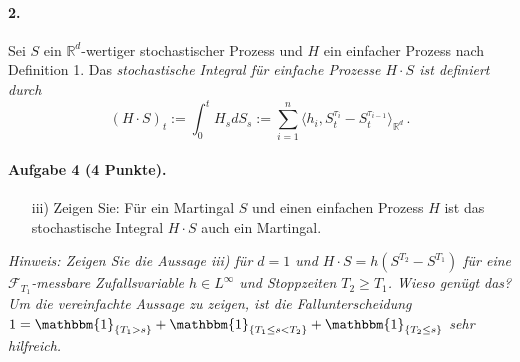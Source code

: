 \documentclass{article}
\begin{document}
\paragraph{ 2.} Sei $S$ ein $\mathbb{R}^d$-wertiger stochastischer Prozess und $H$ ein einfacher Prozess nach Definition 1.
Das \emph{stochastische Integral für einfache Prozesse $H\cdot S$ ist definiert durch}
\[
  (H\cdot S)_t:=\int_0^tH_sdS_s:=\sum_{i=1}^n\langle h_i,S_t^{\tau_i}-S_t^{\tau_{i-1}}\rangle_{\mathbb{R}^d}\,.
\]
\paragraph{Aufgabe 4 \textnormal{(4 Punkte)}.}
\begin{itemize}
\item [iii)] Zeigen Sie: Für ein Martingal $S$ und einen einfachen Prozess $H$ ist das stochastische Integral $H\cdot S$ auch ein Martingal.
\end{itemize}

\noindent\emph{Hinweis: Zeigen Sie  die Aussage iii) für $d=1$ und $H\cdot S=h(S^{T_2}-S^{T_1})$ für eine $\mathscr{F}_{T_1}$-messbare Zufallsvariable $h\in L^\infty$ und Stoppzeiten $T_2\geq T_1$.
Wieso genügt das?
Um die vereinfachte Aussage zu zeigen, ist die Fallunterscheidung $1=\mathbbm{1}_{\{T_1>s\}}+\mathbbm{1}_{\{T_1\leq s<T_2\}}+\mathbbm{1}_{\{T_2\leq s\}}$ sehr hilfreich.}

\end{document}
